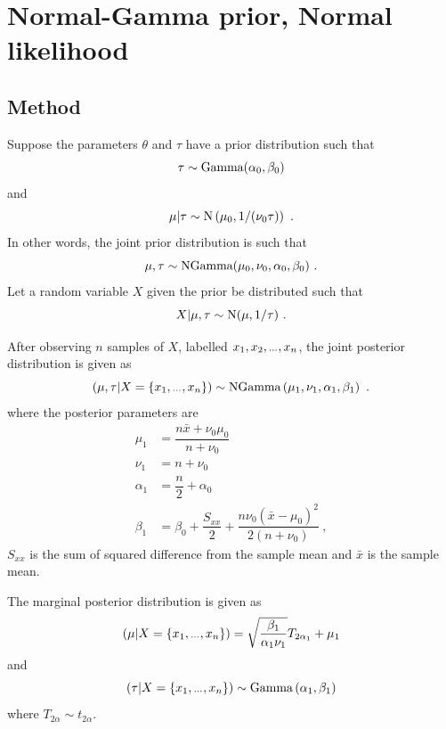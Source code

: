 \documentclass[a4paper,10pt]{article}
\newcommand{\dotdotdot}{\vphantom{.}_{\cdots}}
\begin{document}
\section{Normal-Gamma prior, Normal likelihood}

\subsection{Method}
Suppose the parameters $\theta$ and $\tau$ have a prior distribution such that
\begin{equation}
\tau\sim\textup{Gamma}(\alpha_0,\beta_0)
\end{equation}
and
\begin{equation}
\mu|\tau\sim\textup{N}\left(\mu_0,1/(\nu_0\tau)\right) \ .
\end{equation}
In other words, the joint prior distribution is such that
\begin{equation}
\mu,\tau\sim\textup{NGamma}(\mu_0,\nu_0,\alpha_0,\beta_0) \ .
\end{equation}
Let a random variable $X$ given the prior be distributed such that
\begin{equation}
X|\mu,\tau\sim\textup{N}(\mu,1/\tau) \ .
\end{equation}

After observing $n$ samples of $X$, labelled $x_1,x_2,\dotdotdot ,x_n$, the joint posterior distribution is given as
\begin{equation}
(\mu,\tau|X=\{x_1,\dotdotdot ,x_n\})\sim\textup{NGamma}
\left(
	\mu_1,
	\nu_1,
	\alpha_1,
	\beta_1
\right) \ .
\end{equation}
where the posterior parameters are
\begin{align}
\mu_1 &= \dfrac{n\bar{x}+\nu_0\mu_0}{n+\nu_0} \\
\nu_1 &= n+\nu_0 \\
\alpha_1 &= \dfrac{n}{2}+\alpha_0 \\
\beta_1 &= \beta_0+\dfrac{S_{xx}}{2}+\dfrac{n\nu_0(\bar{x}-\mu_0)^2}{2(n+\nu_0)} \ ,
\end{align}
$S_{xx}$ is the sum of squared difference from the sample mean and $\bar{x}$ is the sample mean.

The marginal posterior distribution is given as
\begin{equation}
(\mu|X=\{x_1,\dotdotdot ,x_n\}) = \sqrt{\dfrac{\beta_1}{\alpha_1\nu_1}} T_{2\alpha_1}
+ \mu_1
\end{equation}
and
\begin{equation}
(\tau|X=\{x_1,\dotdotdot ,x_n\}) \sim \textup{Gamma}\left(
\alpha_1,\beta_1
\right)
\end{equation}
where $T_{2\alpha}\sim t_{2\alpha}$.
\end{document}
